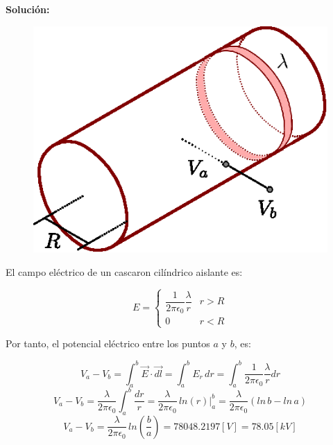 \documentclass[letter,11pt]{article}
\begin{document}
\begin{enumerate}
\textbf{Solución:}

\begin{figure}[!h]
\centering
\includegraphics[scale=0.95]{resources/a8.eps}
\end{figure}

El campo eléctrico de un cascaron cilíndrico aislante es:

\begin{equation*}
    E = \begin{cases}
        \dfrac{1}{2\pi\epsilon_0}\dfrac{\lambda}{r} & r > R \\
        0 & r < R
    \end{cases}
\end{equation*}

Por tanto, el potencial eléctrico entre los puntos $a$ y $b$, es:

\begin{equation*}
    V_a-V_b = \int_{a}^{b}\vec{E}\cdot\vec{dl} = \int_{a}^{b}E_r\,dr = \int_{a}^{b}\frac{1}{2\pi\epsilon_0}\frac{\lambda}{r}dr
\end{equation*}
\begin{equation*}
    V_a-V_b = \frac{\lambda}{2\pi\epsilon_0}\int_{a}^{b} \frac{dr}{r} = \frac{\lambda}{2\pi\epsilon_0}\,ln (r)\Biggr|_{a}^{b} = \frac{\lambda}{2\pi\epsilon_0}(ln\,b-ln\,a)
\end{equation*}
\begin{equation*}
    V_a-V_b = \frac{\lambda}{2\pi\epsilon_0}\,ln\left(\frac{b}{a}\right) = 78048.2197 [V] = 78.05 [kV]
\end{equation*}
\\


\end{enumerate}
\end{document}
